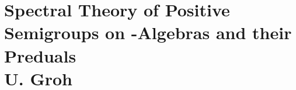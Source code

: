 
\chapter{Spectral Theory of Positive Semigroups on \WA-Algebras and their Preduals \\
U. Groh}\label{chap:D-III}

%
%
%
%
%
%
